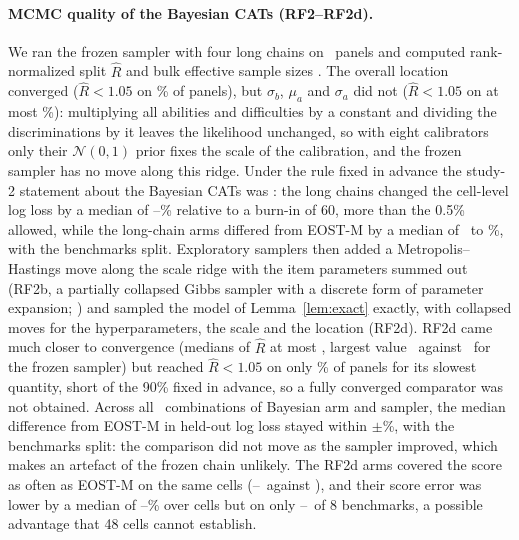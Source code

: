 \paragraph{MCMC quality of the Bayesian CATs (RF2--RF2d).} We ran the frozen sampler with
four long chains on \ConvPanels\ panels and computed rank-normalized split $\hat R$ and bulk
effective sample sizes \citep{vehtari2021rank}. The overall location converged ($\hat R<1.05$
on \ConvLocRhatFive\% of panels), but $\sigma_b$, $\mu_a$ and $\sigma_a$ did not
($\hat R<1.05$ on at most \ConvHypRhatFiveMax\%): multiplying all abilities and difficulties
by a constant and dividing the discriminations by it leaves the likelihood unchanged, so with
eight calibrators only their $\mathcal N(0,1)$ prior fixes the scale of the calibration, and
the frozen sampler has no move along this ridge. Under the rule fixed in advance the study-2
statement about the Bayesian CATs was \ConvRule: the long chains changed the cell-level log
loss by a median of \ConvLongAbsVsSixtyMin--\ConvLongAbsVsSixtyMax\% relative to a burn-in of 60,
more than the 0.5\% allowed, while the long-chain arms differed from EOST-M by a median of \ConvLongVsEostMin\
to \ConvLongVsEostMax\%, with the benchmarks split. Exploratory samplers then added a
Metropolis--Hastings move along the scale ridge with the item parameters summed out (RF2b, a
partially collapsed Gibbs sampler with a discrete form of parameter expansion;
\citealp{vandyk2008partially,liu1999parameter}) and sampled the model of
Lemma~\ref{lem:exact} exactly, with collapsed moves for the hyperparameters, the scale and the
location (RF2d). RF2d came much closer to convergence (medians of $\hat R$ at most
\ExtRhatMedMaxAll, largest value \ExtRhatMaxAll\ against \ConvHypRhatMax\ for the frozen
sampler) but reached $\hat R<1.05$ on only \ExtRhatFiveMin\% of panels for its slowest
quantity, short of the 90\% fixed in advance, so a fully converged comparator was not
obtained. Across all \AllBayesNArms\ combinations of Bayesian arm and sampler, the median
difference from EOST-M in held-out log loss stayed within $\pm$\AllBayesVsEostMaxAbs\%, with
the benchmarks split: the comparison did not move as the sampler improved, which makes an
artefact of the frozen chain unlikely. The RF2d arms covered the score as often as EOST-M
on the same cells (\ExtCovMin--\ExtCovMax\ against \ExtEostCov), and their score error was lower by a median of
\ExtIaeGainMin--\ExtIaeGainMax\% over cells but on only \ExtIaeBanksMin--\ExtIaeBanksMax\ of
8 benchmarks, a possible advantage that 48 cells cannot establish.

